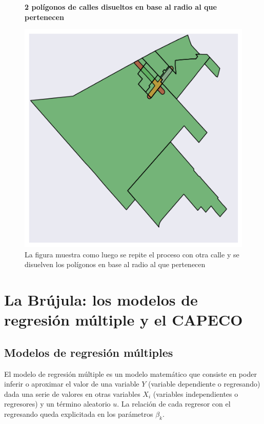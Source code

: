 \begin{figure}[!ht]
	\centering
	\textbf{2 polígonos de calles disueltos en base al radio al que pertenecen}\par\medskip
	\includegraphics[scale = 0.4]{../img/capitulo2/osm_3.png}
	\caption{La figura muestra como luego se repite el proceso con otra calle y se disuelven los polígonos en base al radio al que pertenecen}
\end{figure}



	
\section{La Brújula: los modelos de regresión múltiple y el CAPECO}\label{cap2-brujula}

\subsection{Modelos de regresión múltiples}

El modelo de regresión múltiple \cite{wooldridge,hastie} es un modelo matemático que consiste en poder inferir o aproximar el valor de una variable $Y$ (variable dependiente o regresando) dada una serie de valores en otras variables $X_i$ (variables independientes o regresores) y un término aleatorio $u$. La relación de cada regresor con el regresando queda explicitada en los parámetros $\beta_k$.


